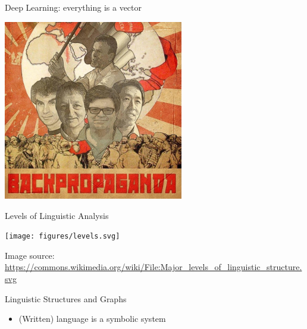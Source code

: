 \begin{frame}{Deep Learning: everything is a vector}
	\vspace{-15pt}
	
  \begin{center}
  	\includegraphics[width=0.59\textwidth]{figures/backprop}
  \end{center}
   

\end{frame}



\begin{frame}{Levels of Linguistic Analysis}
	\vspace{-15pt}
	
  \begin{center}
  	\texttt{[image: figures/levels.svg]}
  \end{center}
   
{  \footnotesize
  Image source: \url{https://commons.wikimedia.org/wiki/File:Major_levels_of_linguistic_structure.svg}
 } 

\end{frame}




\begin{frame}{Linguistic Structures and Graphs}
	
	\begin{itemize}
		\item (Written) language is a \alert{symbolic system}
	\end{itemize}	
	
\end{frame}


